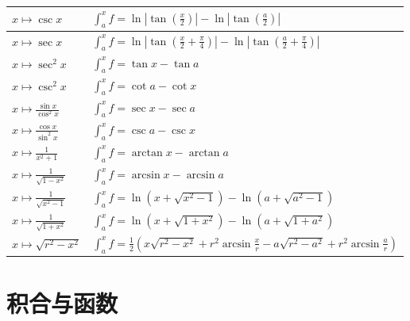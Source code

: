 \documentclass[12pt,UTF8]{ctexbook}
\begin{document}
\begin{appendix}
\begin{center}
\begin{longtable}{|l|l|}
        \hline    
        $\displaystyle x\mapsto \csc{x}$ & $\displaystyle \int_a^x f = \ln{\left|\tan{\left(\frac{x}{2}\right)}\right|} - \ln{\left|\tan{\left(\frac{a}{2}\right)}\right|}$ \\[4pt]
        \hline    
        $\displaystyle x\mapsto \sec{x}$ & $\displaystyle \int_a^x f = \ln{\left|\tan{\left(\frac{x}{2} + \frac{\pi}{4}\right)}\right|} - \ln{\left|\tan{\left(\frac{a}{2} + \frac{\pi}{4}\right)}\right|}$ \\[4pt]
        \hline    
        $\displaystyle x\mapsto \sec^2{x}$ & $\displaystyle \int_a^x f = \tan{x} - \tan{a}$ \\[4pt]
        \hline    
        $\displaystyle x\mapsto \csc^2{x}$ & $\displaystyle \int_a^x f = \cot{a} - \cot{x}$ \\[4pt]
        \hline    
        $\displaystyle x\mapsto \frac{\sin{x}}{\cos^2{x}}$ & $\displaystyle \int_a^x f = \sec{x} - \sec{a}$ \\[4pt]
        \hline    
        $\displaystyle x\mapsto \frac{\cos{x}}{\sin^2{x}}$ & $\displaystyle \int_a^x f = \csc{a} - \csc{x}$ \\[4pt]
        \hline    
        $\displaystyle x\mapsto \frac{1}{x^2 + 1}$ & $\displaystyle \int_a^x f = \arctan{x} - \arctan{a}$ \\[4pt]
        \hline    
        $\displaystyle x\mapsto \frac{1}{\sqrt{1 - x^2}}$ & $\displaystyle \int_a^x f = \arcsin{x} - \arcsin{a}$ \\[4pt]
        \hline    
        $\displaystyle x\mapsto \frac{1}{\sqrt{x^2 - 1}}$ & $\displaystyle \int_a^x f = \ln{\left(x + \sqrt{x^2 - 1}\right)} - \ln{\left(a + \sqrt{a^2 - 1}\right)}$ \\[4pt]
        \hline    
        $\displaystyle x\mapsto \frac{1}{\sqrt{1 + x^2}}$ & $\displaystyle \int_a^x f = \ln{\left(x + \sqrt{1 + x^2}\right)} - \ln{\left(a + \sqrt{1 + a^2}\right)}$ \\[4pt]
        \hline    
        $\displaystyle x\mapsto \sqrt{r^2 - x^2}$ & $\displaystyle \int_a^x f = \frac{1}{2}\left(x\sqrt{r^2 - x^2} + r^2\arcsin{\frac{x}{r}} - a\sqrt{r^2 - a^2} + r^2\arcsin{\frac{a}{r}}\right)$ \\[4pt]
        \hline
    \end{longtable}
\end{center}

\section{积合与函数}


\end{appendix}
\end{document}
